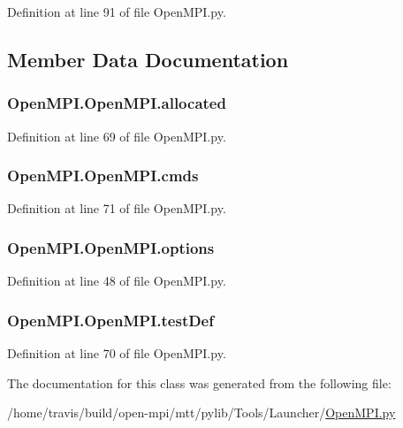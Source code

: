 Definition at line 91 of file Open\-M\-P\-I.\-py.



\subsection{Member Data Documentation}
\hypertarget{class_open_m_p_i_1_1_open_m_p_i_a9ffab4795264fde34d136269026204db}{
\subsubsection[{allocated}]{\setlength{\rightskip}{0pt plus 5cm}Open\-M\-P\-I.\-Open\-M\-P\-I.\-allocated}}\label{class_open_m_p_i_1_1_open_m_p_i_a9ffab4795264fde34d136269026204db}


Definition at line 69 of file Open\-M\-P\-I.\-py.

\hypertarget{class_open_m_p_i_1_1_open_m_p_i_a86be93bbc775c81263813274a8564efc}{
\subsubsection[{cmds}]{\setlength{\rightskip}{0pt plus 5cm}Open\-M\-P\-I.\-Open\-M\-P\-I.\-cmds}}\label{class_open_m_p_i_1_1_open_m_p_i_a86be93bbc775c81263813274a8564efc}


Definition at line 71 of file Open\-M\-P\-I.\-py.

\hypertarget{class_open_m_p_i_1_1_open_m_p_i_a4a263774614f0b83a63a26639b46b2f5}{
\subsubsection[{options}]{\setlength{\rightskip}{0pt plus 5cm}Open\-M\-P\-I.\-Open\-M\-P\-I.\-options}}\label{class_open_m_p_i_1_1_open_m_p_i_a4a263774614f0b83a63a26639b46b2f5}


Definition at line 48 of file Open\-M\-P\-I.\-py.

\hypertarget{class_open_m_p_i_1_1_open_m_p_i_acd20b78013350c2363484589ef85b67c}{
\subsubsection[{test\-Def}]{\setlength{\rightskip}{0pt plus 5cm}Open\-M\-P\-I.\-Open\-M\-P\-I.\-test\-Def}}\label{class_open_m_p_i_1_1_open_m_p_i_acd20b78013350c2363484589ef85b67c}


Definition at line 70 of file Open\-M\-P\-I.\-py.



The documentation for this class was generated from the following file\-:\begin{DoxyCompactItemize}
\item 
/home/travis/build/open-\/mpi/mtt/pylib/\-Tools/\-Launcher/\hyperlink{_open_m_p_i_8py}{Open\-M\-P\-I.\-py}\end{DoxyCompactItemize}
